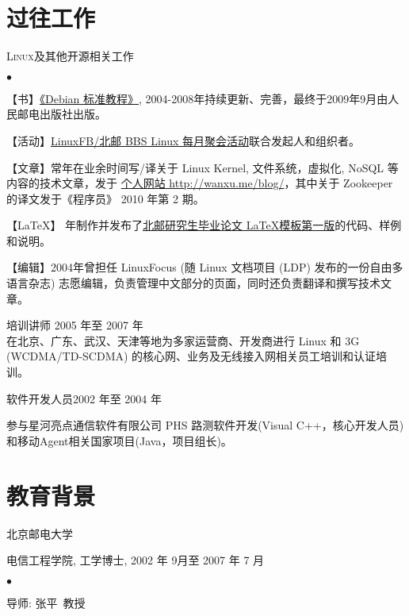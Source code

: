 \documentclass[margin,line]{res}
\newenvironment{list1}{
  \begin{list}{\ding{113}}{%
      \setlength{\itemsep}{0in}
      \setlength{\parsep}{0in} \setlength{\parskip}{0in}
      \setlength{\topsep}{0in} \setlength{\partopsep}{0in} 
      \setlength{\leftmargin}{0.17in}}}{\end{list}}
\newenvironment{list2}{
  \begin{list}{$\bullet$}{%
      \setlength{\itemsep}{0in}
      \setlength{\parsep}{0in} \setlength{\parskip}{0in}
      \setlength{\topsep}{0in} \setlength{\partopsep}{0in} 
      \setlength{\leftmargin}{0.2in}}}{\end{list}}
\newcommand{\http}{http:/\hspace{-0.3ex}/}
\begin{document}
\begin{resume}
\section{过往工作}

\textsc{Linux}\textsf{及其他开源相关工作} \\
\vspace*{-.1in}
\begin{list2}
\item 【书】\enskip \href{http://wangxu.me/blog/p/tag/unleashed}{《Debian 标准教程》}, 2004-2008年持续更新、完善，最终于2009年9月由人民邮电出版社出版。
\item 【活动】\enskip \href{http://linuxfb.org}{LinuxFB/北邮 BBS Linux 每月聚会活动}联合发起人和组织者。
\item 【文章】\enskip 常年在业余时间写/译关于 Linux Kernel, 文件系统，虚拟化, NoSQL 等内容的技术文章，发于 \href{http://wangxu.me/blog/}{个人网站 \http{}wanxu.me/blog/}，其中关于 Zookeeper 的译文发于《程序员》 2010 年第 2 期。
\item 【\LaTeX】 年制作并发布了\href{http://code.google.com/p/latex-bupt}{北邮研究生毕业论文 \LaTeX 模板第一版}的代码、样例和说明。
\item 【编辑】\enskip 2004年曾担任 LinuxFocus (随 Linux 文档项目 (LDP) 发布的一份自由多语言杂志) 志愿编辑，负责管理中文部分的页面，同时还负责翻译和撰写技术文章。
\end{list2}

\textsf{培训讲师} \hfill \textsf{2005 年至 2007 年}\\
在北京、广东、武汉、天津等地为多家运营商、开发商进行 Linux 和 3G (WCDMA/TD-SCDMA) 的核心网、业务及无线接入网相关员工培训和认证培训。

\textsf{软件开发人员}\hfill \textsf{2002 年至 2004 年}\\
\vspace*{-.1in}
\begin{list1}
\item[]  参与星河亮点通信软件有限公司 PHS 路测软件开发(Visual C++，核心开发人员)和移动Agent相关国家项目(Java，项目组长)。
\end{list1}


\section{教育背景}
\textsf{北京邮电大学}\\
\vspace*{-.1in}
\begin{list1}
\item[] 电信工程学院, 工学博士, 2002 年 9月至 2007 年 7 月
\begin{list2}
\vspace*{.05in}
\item 导师: 张平\ 教授
\end{list2}
\end{list1}


\end{resume}
\end{document}
